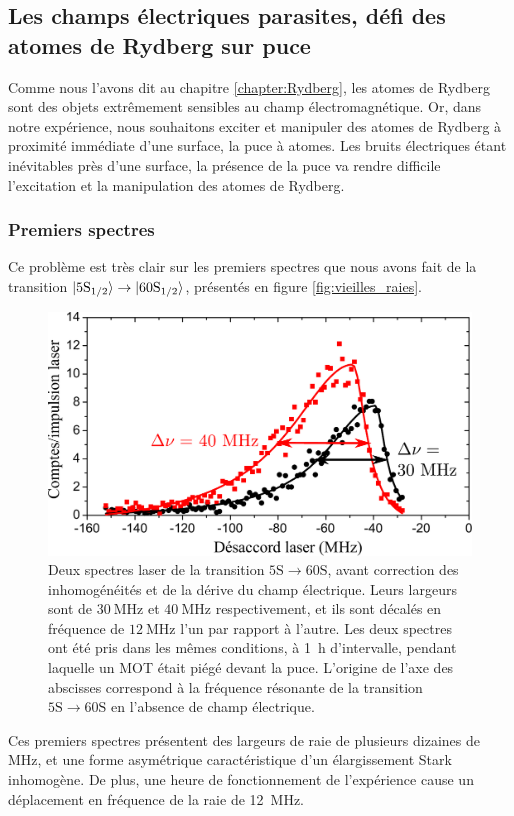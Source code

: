 		
	\subsection{Les champs électriques parasites, défi des atomes de Rydberg sur puce}\label{subsec:flashRb}
\noindent Comme nous l'avons dit au chapitre \ref{chapter:Rydberg}, les atomes de Rydberg sont des objets extrêmement sensibles au champ électromagnétique.
Or, dans notre expérience, nous souhaitons exciter et manipuler des atomes de Rydberg à proximité immédiate d'une surface, la puce à atomes.
Les bruits électriques étant inévitables près d'une surface, la présence de la puce va rendre difficile l'excitation et la manipulation des atomes de Rydberg.

\subsubsection*{Premiers spectres}
\noindent Ce problème est très clair sur les premiers spectres que nous avons fait de la transition $\ket{\mathrm{5S_{1/2}}} \rightarrow \ket{\mathrm{60S_{1/2}}}$, présentés en figure \eqref{fig:vieilles_raies}.
%
\begin{figure}[h]
\centering
\includegraphics[width=.8\linewidth]{figures/vieilles_raies}
\caption[Spectres d'excitation laser 5S-60S avant le dépôt de rubidium sur la puce]{
Deux spectres laser de la transition $5\mathrm{S}\rightarrow60\mathrm{S}$, avant correction des inhomogénéités et de la dérive du champ électrique.
Leurs largeurs sont de $\SI{30}{\MHz}$ et $\SI{40}{\MHz}$ respectivement, et ils sont décalés en fréquence de $\SI{12}{\MHz}$ l'un par rapport à l'autre.
Les deux spectres ont été pris dans les mêmes conditions, à \SI{1}{\hour} d'intervalle, pendant laquelle un MOT était piégé devant la puce.
L'origine de l'axe des abscisses correspond à la fréquence résonante de la transition $\mathrm{5S}\rightarrow\mathrm{60S}$ en l'absence de champ électrique.
}
\label{fig:vieilles_raies}
\end{figure}
%
Ces premiers spectres présentent des largeurs de raie de plusieurs dizaines de $\si{\MHz}$, et une forme asymétrique caractéristique d'un élargissement Stark inhomogène.
De plus, une heure de fonctionnement de l'expérience cause un déplacement en fréquence de la raie de \SI{12}{\MHz}.

